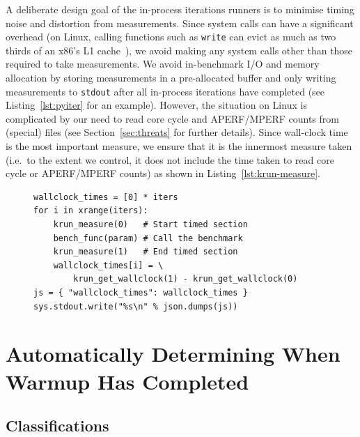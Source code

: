 \documentclass[preprint,numbers,10pt]{sigplanconf}
\begin{document}
A deliberate design goal of the in-process iterations runners is to minimise
timing noise and distortion from measurements. Since system calls can have a
significant overhead (on Linux, calling functions such as \texttt{write} can
evict as much as two thirds of an x86's L1 cache~\cite{soares10flexsc}), we
avoid making any system calls other than those required to take measurements. We
avoid in-benchmark I/O and memory allocation by storing measurements in a
pre-allocated buffer and only writing measurements to \texttt{stdout} after all
in-process iterations have completed (see Listing~\ref{lst:pyiter} for an
example). However, the situation on Linux is complicated by our need to read
core cycle and APERF/MPERF counts from (special) files (see
Section~\ref{sec:threats} for further details). Since wall-clock time
is the most important measure, we ensure that it is the innermost measure taken
(i.e.~to the extent we control, it does not include the time taken to read
core cycle or APERF/MPERF counts) as shown in Listing~\ref{lst:krun-measure}.

\begin{figure}[t]
\begin{lstlisting}[label=lst:pyiter, caption={An elided version of the Python
in-process iterations runner (with core cycles etc. removed).}]
wallclock_times = [0] * iters
for i in xrange(iters):
    krun_measure(0)   # Start timed section
    bench_func(param) # Call the benchmark
    krun_measure(1)   # End timed section
    wallclock_times[i] = \
        krun_get_wallclock(1) - krun_get_wallclock(0)
js = { "wallclock_times": wallclock_times }
sys.stdout.write("%s\n" % json.dumps(js))
\end{lstlisting}
\end{figure}


\section{Automatically Determining When Warmup Has Completed}


\subsection{Classifications}
\end{document}
